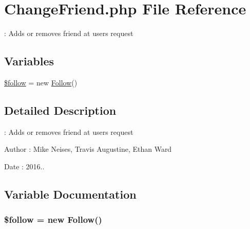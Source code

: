 \hypertarget{_change_friend_8php}{}\section{Change\+Friend.\+php File Reference}
\label{_change_friend_8php}


\+: Adds or removes friend at user\textquotesingle{}s request  


\subsection*{Variables}
\begin{DoxyCompactItemize}
\item 
\hyperlink{_change_friend_8php_ab5929d3bc848873a208b38b88e7b226c}{\$follow} = new \hyperlink{class_follow}{Follow}()
\end{DoxyCompactItemize}


\subsection{Detailed Description}
\+: Adds or removes friend at user\textquotesingle{}s request 

\begin{DoxyAuthor}{Author}
\+: Mike Neises, Travis Augustine, Ethan Ward 
\end{DoxyAuthor}
\begin{DoxyDate}{Date}
\+: 2016.. 
\end{DoxyDate}


\subsection{Variable Documentation}
\subsubsection[{\texorpdfstring{\$follow}{$follow}}]{\setlength{\rightskip}{0pt plus 5cm}\$follow = new {\bf Follow}()}\hypertarget{_change_friend_8php_ab5929d3bc848873a208b38b88e7b226c}{}\label{_change_friend_8php_ab5929d3bc848873a208b38b88e7b226c}
